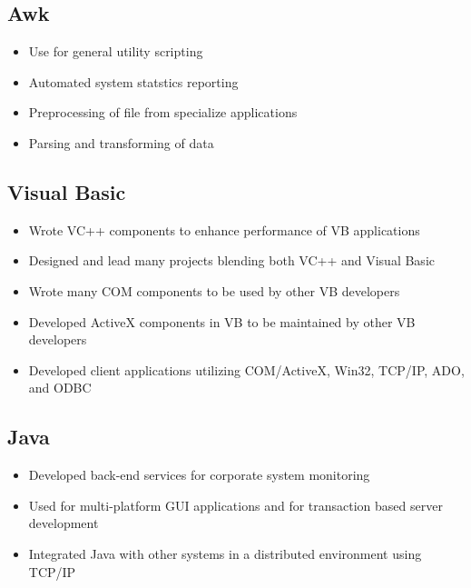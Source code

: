 \documentclass[10pt]{report}
\begin{document}
\subsection*{Awk}
\begin{itemize}
\item Use for general utility scripting 
\item Automated system statstics reporting
\item Preprocessing of file from specialize applications
\item Parsing and transforming of data
\end{itemize}


\subsection*{Visual Basic}
\begin{itemize}
\item Wrote VC++ components to enhance performance of VB applications
\item Designed and lead many projects blending both VC++ and Visual Basic
\item Wrote many COM components to be used by other VB developers
\item Developed ActiveX components in VB to be maintained by other VB developers
\item Developed client applications utilizing COM/ActiveX, Win32, TCP/IP, ADO, and ODBC

\end{itemize}


\subsection*{Java}
\begin{itemize}
\item Developed back-end services for corporate system monitoring
\item Used for multi-platform GUI applications and for transaction based server development
\item Integrated Java with other systems in a distributed environment using TCP/IP
\end{itemize}
\end{document}

